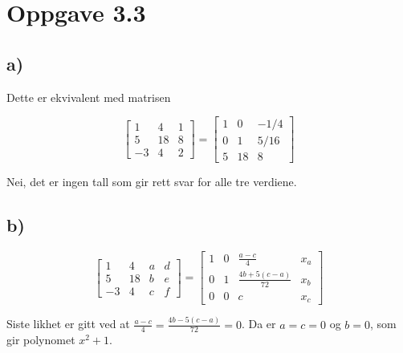 \section{Oppgave 3.3}

\subsection*{a)}

Dette er ekvivalent med matrisen 

\[
    \left[
    \begin{array}{cc|c}
        1&4&1\\
        5&18&8\\
        -3&4&2
    \end{array}
    \right] = 
    \left[
        \begin{array}{cc|c}
            1&0&-1/4\\
            0&1&5/16\\
            5&18&8
        \end{array}
    \right]
\]

Nei, det er ingen tall som gir rett svar for alle tre verdiene. 

\subsection*{b)}

\[
    \left[
    \begin{array}{ccc|c}
        1&4&a&d\\
        5&18&b&e\\
        -3&4&c&f
    \end{array}
    \right] = 
    \left[
        \begin{array}{ccc|c}
            1&0&\tfrac{a-c}{4}&x_a\\
            0&1&\tfrac{4b + 5(c-a)}{72}&x_b\\
            0&0&c&x_c
        \end{array}
    \right]
\]

Siste likhet er gitt ved at \(\tfrac{a-c}{4} = \tfrac{4b-5(c-a)}{72} = 0\). Da er \(a = c = 0\) og \(b = 0\), som gir polynomet \(x^2+1\).